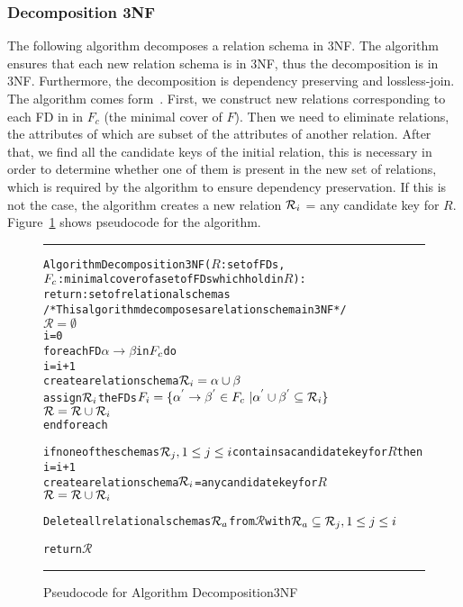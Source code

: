 \subsubsection{Decomposition 3NF}
The following algorithm decomposes a relation schema in 3NF. The algorithm
ensures that each new relation schema is in 3NF, thus the decomposition is in 3NF. 
Furthermore, the decomposition is dependency preserving and lossless-join. 
The algorithm comes form~\cite[Section 6.8]{bdb2}. 
First, we construct new relations corresponding to each FD in in $F_{c}$ (the minimal cover of $F$). 
Then we need to eliminate relations, the attributes of
which are subset of the attributes of another relation. 
After that, we find all the candidate keys of
the initial relation, this is necessary in order to determine  whether one of them is present
in the new set of relations, which is required by the algorithm to ensure
dependency preservation. If this is not the case, the algorithm creates
a new relation \(\mathcal{R}\sb{i}\) = any candidate key for \(R\).
Figure~\ref{alg:dec3nf} shows pseudocode for the algorithm.

\begin{figure}[htbp]
\hrule
\begin{alltt}

Algorithm Decomposition3NF(\(R\): set of FDs,
             \(F\sb{c}\): minimal cover of a set of FDs which hold in \(R\)):
          return: set of relational schemas  
/* This algorithm decomposes a relation schema in 3NF */
  \(\mathcal{R} = \emptyset\)
  i = 0
  foreach FD \(\alpha \rightarrow \beta\) in \(F\sb{c}\) do
    i = i + 1
    create a relation schema \(\mathcal{R}\sb{i} = \alpha \cup \beta\)
    assign \(\mathcal{R}\sb{i}\) the FDs  \(F\sb{i} = \{\alpha\sp{'} \rightarrow \beta\sp{'} \in F\sb{c}\ | \alpha\sp{'} \cup \beta\sp{'} \subseteq \mathcal{R}\sb{i}\}\)
    \(\mathcal{R} = \mathcal{R} \cup \mathcal{R}\sb{i}\)
  end foreach
  
  if none of the schemas \(\mathcal{R}\sb{j}, 1\leq{}j\leq{}i\) contains a candidate key for \(R\) then
    i = i + 1
    create a relation schema \(\mathcal{R}\sb{i}\) = any candidate key for \(R\)
    \(\mathcal{R} = \mathcal{R} \cup \mathcal{R}\sb{i}\)
    
  Delete all relational schemas \(\mathcal{R}\sb{a}\) from \(\mathcal{R}\) with \(\mathcal{R}\sb{a} \subseteq \mathcal{R}\sb{j},  1 \leq j \leq i\)
  
  return \(\mathcal{R}\)
\end{alltt}
\caption{Pseudocode for Algorithm Decomposition3NF}\label{alg:dec3nf}
\hrule
\end{figure}

